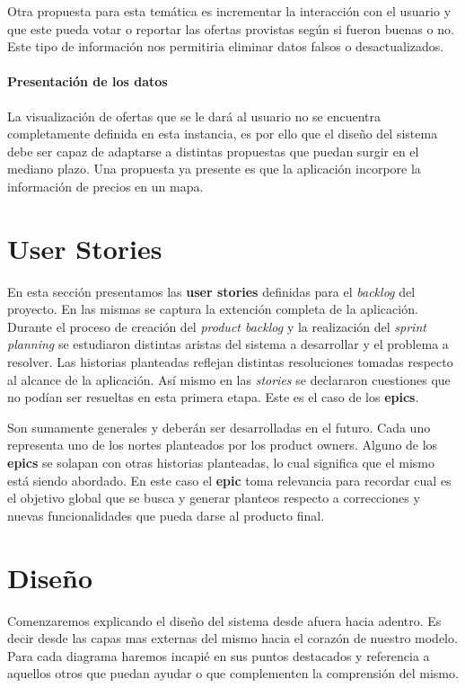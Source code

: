 \documentclass[10pt, a4paper]{article}
\begin{document}
Otra propuesta para esta temática es incrementar la interacción con el usuario y que este pueda votar o reportar las ofertas provistas según si fueron buenas o no. Este tipo de información nos permitiria eliminar datos falsos o desactualizados.

\paragraph{Presentación de los datos}
La visualización de ofertas que se le dará al usuario no se encuentra completamente definida en esta instancia, es por ello que el diseño del sistema debe ser capaz de adaptarse a distintas propuestas que puedan surgir en el mediano plazo. Una propuesta ya presente es que la aplicación incorpore la información de precios en un mapa.


\section{User Stories}

En esta sección presentamos las \textbf{user stories} definidas para el \emph{backlog} del proyecto. En las mismas se captura la extención completa de la aplicación. Durante el proceso de creación del \emph{product backlog} y la realización del \emph{sprint planning} se estudiaron distintas aristas del sistema a desarrollar y el problema a resolver. Las historias planteadas reflejan distintas resoluciones tomadas respecto al alcance de la aplicación. Así mismo en las \emph{stories} se declararon cuestiones que no podían ser resueltas en esta primera etapa. Este es el caso de los \textbf{epics}. 

Son sumamente generales y deberán ser desarrolladas en el futuro. Cada uno representa uno de los nortes planteados por los \textsf{product owners}. Alguno de los \textbf{epics} se solapan con otras historias planteadas, lo cual significa que el mismo está siendo abordado. En este caso el \textbf{epic} toma relevancia para recordar cual es el objetivo global que se busca y generar planteos respecto a correcciones y nuevas funcionalidades que pueda darse al producto final. 



\section{Diseño}

Comenzaremos explicando el diseño del sistema desde afuera hacia adentro. Es decir desde las capas mas externas del mismo hacia el corazón de nuestro modelo. Para cada diagrama haremos incapi\'e en sus puntos destacados y referencia a aquellos otros que puedan ayudar o que complementen la comprensi\'on del mismo.
\end{document}
